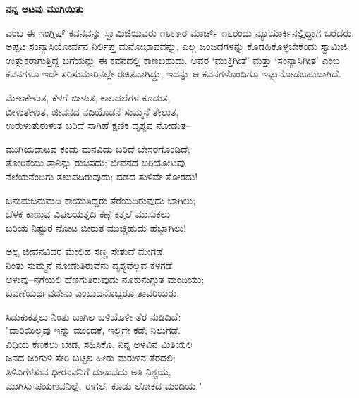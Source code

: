 \selectkan

\begin{center}
\textbf{ನನ್ನ ಆಟವು ಮುಗಿಯಿತು}
\end{center}

 ಎಂಬ ಈ ಇಂಗ್ಲಿಷ್ ಕವನವನ್ನು ಸ್ವಾಮಿಜಿಯವರು ೧೮೯೫ರ ಮಾರ್ಚ್ ೧೬ರಂದು ನ್ಯೂಯಾರ್ಕಿನಲ್ಲಿದ್ದಾಗ ಬರೆದರು. ಅಪ್ಪಟ ಸಂನ್ಯಾಸಿಯೋರ್ವನ ನಿರ್ಲಿಪ್ತ ಮನೋಭಾವವನ್ನು, ಎಲ್ಲ ಜಂಜಡಗಳನ್ನು ಕೊಡಹಿಕೊಳ್ಳಬೇಕೆಂದು ಸ್ವಾಮಿಜಿ ಉತ್ಸುಕರಾಗುತ್ತಿದ್ದ ಬಗೆಯನ್ನು ಈ ಕವನದಲ್ಲಿ ಕಾಣಬಹುದು. ಅವರ ‘ಮುಕ್ತಿಗೀತೆ’ ಮತ್ತು ‘ಸಂನ್ಯಾಸಿಗೀತ’ ಎಂಬ ಕವನಗಳೂ ಇದೇ ಸರಿಸುಮಾರಿನಲ್ಲೇ ರಚಿತವಾಗಿದ್ದು, ಇದನ್ನು ಆ ಕವನಗಳೊಂದಿಗೂ ಇಟ್ಟುನೋಡಬಹುದಾಗಿದೆ.

\begin{myquote}
ಮೇಲಕೇಳುತ, ಕೆಳಗೆ ಬೀಳುತ, ಕಾಲದಲೆಗಳ ಕೂಡುತ,\\ಬೀಳುತೇಳುತ, ಜೀವನದ ನದಿಯೊಡನೆ ಸುಮ್ಮನೆ ತೇಲುತ,\\ಉರುಳುತುರುಳುತ ಬರಿದೆ ಸಾಗಿಹೆ ಕ್ಷಣಿಕ ದೃಶ್ಯವ ನೋಡುತ–
\end{myquote}

\begin{myquote}
ಮುಗಿಯದಾಟವ ಕಂಡು ಮನವಿದು ಬರಿದೆ ಬೇಸರಗೊಂಡಿದೆ;\\ತೋರಿಕೆಯು ತಾನಿನ್ನು ರುಚಿಸದು; ಜೀವನದ ಬರಿಯೋಟವು\\ನೆಲೆಯನೆಂದಿಗು ತಲುಪದಿರುವುದು; ದಡದ ಸುಳಿವೇ ತೋರದು!
\end{myquote}

\begin{myquote}
ಜನುಮಜನುಮದಿ ಕಾಯುತಿದ್ದರು ತೆರೆಯದಿರುವುದು ಬಾಗಿಲು;\\ಬೆಳಕ ಕಾಣುವ ವಿಫಲಯತ್ನದಿ ಕಣ್ಗೆ ಕತ್ತಲೆ ಮುಸುಕಲು\\ಬರಿಯ ನಿಷ್ಟುರ ನೋಟ ಬೀರುತ ಮುಚ್ಚಿಹುದು ಹೆಬ್ಬಾಗಿಲು!
\end{myquote}

\begin{myquote}
ಅಲ್ಪ ಜೀವನವಿದರ ಮೇಲಿಹ ಸಣ್ಣ ಸೇತುವೆ ಮೇಗಡೆ\\ನಿಂತು ಸುಮ್ಮನೆ ನೋಡುತಿರುವೆನು ದೃಶ್ಯವೆಲ್ಲವ ಕೆಳಗಡೆ\\ಅಳುವು–ನಗೆಯಲಿ ಹೆಣಗುತಿರುವುದು ನೂಕುನುಗ್ಗುತ ಮಂದಿಯು;\\ಬವಣೆಯರ್ಥವದೇನು ಎಂಬುದನೊಬ್ಬರೂ ತಾವರಿಯರು.
\end{myquote}

\begin{myquote}
ಸಿಡುಕುಕತ್ತಲು ನಿಂತು ಬಾಗಿಲ ಬಳಿಯೊಳೀ ತೆರ ನುಡಿದಿದೆ:\\"ದಾರಿಯಿಲ್ಲವು ಇನ್ನು ಮುಂದಕೆ, ಇಲ್ಲಿಗೇ ಕಡೆ; ನಿಲುಗಡೆ.\\ವಿಧಿಯ ಕೆಣಕಲು ಬೇಡ, ಸಹಿಸಿಕೊ, ನಿನ್ನ ಅಳವಿನ ಮಿತಿಯಲಿ\\ಜನದ ಜಂಗುಳಿ ಸೇರಿ ಬಟ್ಟಲ ಹೀರು ಮರುಳನ ತೆರದಲಿ;\\ತಿಳಿವಿಗೆಳಸುವ ಧೀರನವನಿಗೆ ದುಃಖವದು ಅತಿ ನಿಶ್ಚಯ,\\ಮುಗಿಸು ಪಯಣವನಿಲ್ಲೆ, ಈಗಲೆ, ಕೂಡು ಲೋಕದ ಮಂದಿಯ."
\end{myquote}

